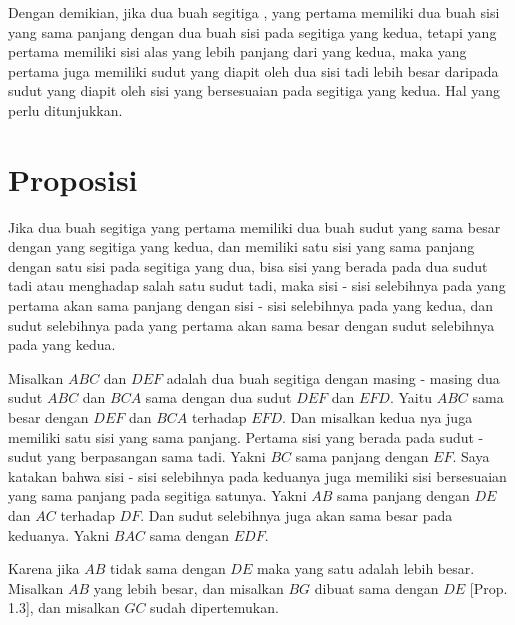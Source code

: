 \documentclass[a4paper]{book}
\begin{document}
Dengan demikian, jika dua buah segitiga , yang pertama memiliki dua buah sisi 
yang sama panjang dengan dua buah sisi pada segitiga yang kedua, tetapi
yang pertama memiliki sisi alas yang lebih panjang dari yang kedua, 
maka yang pertama juga memiliki sudut yang diapit oleh dua sisi tadi
lebih besar daripada sudut yang diapit oleh sisi yang bersesuaian 
pada segitiga yang kedua. Hal yang perlu ditunjukkan.

\section*{\centering Proposisi \thesection}
Jika dua buah segitiga yang pertama memiliki dua buah sudut yang sama besar
dengan yang segitiga yang kedua, dan memiliki satu sisi yang sama panjang dengan
satu sisi pada segitiga yang dua, bisa sisi yang berada pada dua sudut tadi atau
menghadap salah satu sudut tadi, maka sisi - sisi selebihnya pada yang 
pertama akan sama panjang dengan sisi - sisi selebihnya pada yang kedua, dan 
sudut selebihnya pada yang pertama akan sama besar dengan sudut selebihnya pada
yang kedua.
\begin{center}
\end{center}


Misalkan $ABC$ dan $DEF$ adalah dua buah segitiga dengan masing - masing dua 
sudut $ABC$ dan $BCA$ sama dengan dua sudut $DEF$ dan $EFD$.  Yaitu $ABC$ sama
besar dengan $DEF$ dan $BCA$ terhadap $EFD$. Dan misalkan kedua nya juga 
memiliki satu sisi yang sama panjang. Pertama sisi yang berada pada sudut - sudut
yang berpasangan sama tadi. Yakni $BC$ sama panjang dengan $EF$. Saya katakan bahwa
sisi - sisi selebihnya pada keduanya juga memiliki sisi bersesuaian yang sama 
panjang pada segitiga satunya. Yakni $AB$ sama panjang dengan $DE$ dan $AC$ 
terhadap $DF$.  Dan sudut selebihnya juga akan sama besar pada keduanya. 
Yakni $BAC$ sama dengan $EDF$.

Karena jika $AB$ tidak sama dengan $DE$ maka yang satu adalah lebih besar. Misalkan
$AB$ yang lebih besar, dan misalkan $BG$ dibuat sama dengan $DE$ [Prop. 1.3], dan
misalkan $GC$ sudah dipertemukan.
\end{document}
